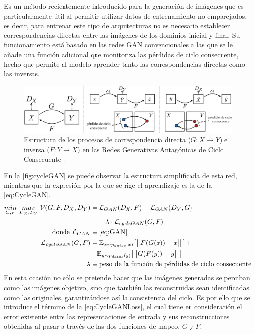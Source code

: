 Es un método recientemente introducido \cite{cycleGAN} para la generación de imágenes que es particularmente útil al permitir utilizar datos de entrenamiento no emparejados, es decir, para entrenar este tipo de arquitecturas no es necesario establecer correspondencias directas entre las imágenes de los dominios inicial y final. Su funcionamiento está basado en las redes GAN convencionales a las que se le añade una función adicional que monitoriza las pérdidas de ciclo consecuente, hecho que permite al modelo aprender tanto las correspondencias directas como las inversas.
\begin{figure}
    \centering
    \includegraphics[width=\textwidth]{Images/cycleGAN.png}
    \caption{Estructura de los procesos de correspondencia directa ($G : X \to Y$) e inversa ($F : Y \to X$) en las Redes Generativas Antagónicas de Ciclo Consecuente \cite{cycleGAN}.}
    \label{fig:cycleGAN}
\end{figure}

En la \autoref{fig:cycleGAN} se puede observar la estructura simplificada de esta red, mientras que la expresión por la que se rige el aprendizaje es la de la \autoref{eq:CycleGAN}.
\begin{align}
    \underset{G,F}{min} \ \underset{D_X, D_Y}{max} \ \mathcal{V}(G, F, D_X, D_Y) &= \mathcal{L}_{GAN}(D_X, F) + \mathcal{L}_{GAN}(D_Y, G) \notag \\ &\quad + \lambda \cdot \mathcal{L}_{cycleGAN}(G, F) \label{eq:CycleGAN} \\
    \text{donde}~
    \mathcal{L}_{GAN} &\equiv \text{\autoref{eq:GAN}} \notag \\
    \mathcal{L}_{cycleGAN}(G, F) &= \mathbb{E}_{x\sim p_{datos}(x)} \big[\norm{F(G(x)) - x}\big] + \notag \\ &\quad \mathbb{E}_{y\sim p_{datos}(y)} \big[\norm{G(F(y)) - y}\big] \label{eq:CycleGANLoss}\\
    \lambda &\equiv \text{peso de la función de pérdidas de ciclo consecuente} \notag
\end{align}
En esta ocasión no sólo se pretende hacer que las imágenes generadas se perciban como las imágenes objetivo, sino que también las reconstruidas sean identificadas como las originales, garantizándose así la consistencia del ciclo. Es por ello que se introduce el término de la \autoref{eq:CycleGANLoss}, el cual tiene en consideración el error existente entre las representaciones de entrada y sus reconstrucciones obtenidas al pasar a través de las dos funciones de mapeo, $G$ y $F$.

